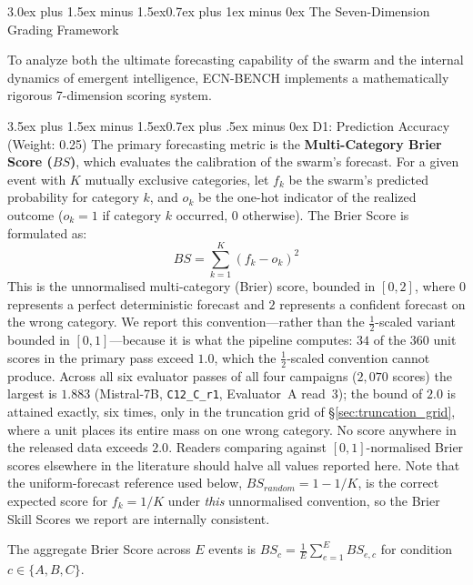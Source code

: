\documentclass[11pt,journal,onecolumn]{IEEEtran}
\makeatletter
\renewcommand\section{\@startsection{section}{1}{\z@}%
  {3.0ex plus 1.5ex minus 1.5ex}{0.7ex plus 1ex minus 0ex}%
  {\normalfont\normalsize\centering\bfseries}}
\renewcommand\subsection{\@startsection{subsection}{2}{\z@}%
  {3.5ex plus 1.5ex minus 1.5ex}{0.7ex plus .5ex minus 0ex}%
  {\normalfont\normalsize\bfseries}}
\makeatother
\begin{document}
\section{The Seven-Dimension Grading Framework}
\label{sec:grading}

To analyze both the ultimate forecasting capability of the swarm and the internal dynamics of emergent intelligence, ECN-BENCH implements a mathematically rigorous 7-dimension scoring system. 

\subsection{D1: Prediction Accuracy (Weight: 0.25)}
The primary forecasting metric is the \textbf{Multi-Category Brier Score ($BS$)}, which evaluates the calibration of the swarm's forecast. For a given event with $K$ mutually exclusive categories, let $f_k$ be the swarm's predicted probability for category $k$, and $o_k$ be the one-hot indicator of the realized outcome ($o_k = 1$ if category $k$ occurred, $0$ otherwise). The Brier Score is formulated as:
\begin{equation}
    BS = \sum_{k=1}^K (f_k - o_k)^2
\end{equation}
This is the unnormalised multi-category (Brier) score, bounded in $[0, 2]$, where $0$ represents a perfect deterministic forecast and $2$ represents a confident forecast on the wrong category. We report this convention---rather than the $\frac{1}{2}$-scaled variant bounded in $[0,1]$---because it is what the pipeline computes: $34$ of the $360$ unit scores in the primary pass exceed $1.0$, which the $\frac{1}{2}$-scaled convention cannot produce. Across all six evaluator passes of all four campaigns ($2{,}070$ scores) the largest is $1.883$ (Mistral-7B, \texttt{C12\_C\_r1}, Evaluator~A read~3); the bound of $2.0$ is attained exactly, six times, only in the truncation grid of \S\ref{sec:truncation_grid}, where a unit places its entire mass on one wrong category. No score anywhere in the released data exceeds $2.0$. Readers comparing against $[0,1]$-normalised Brier scores elsewhere in the literature should halve all values reported here. Note that the uniform-forecast reference used below, $BS_{random} = 1 - 1/K$, is the correct expected score for $f_k = 1/K$ under \emph{this} unnormalised convention, so the Brier Skill Scores we report are internally consistent.

The aggregate Brier Score across $E$ events is $BS_c = \frac{1}{E} \sum_{e=1}^E BS_{e,c}$ for condition $c \in \{A, B, C\}$. 
\end{document}
